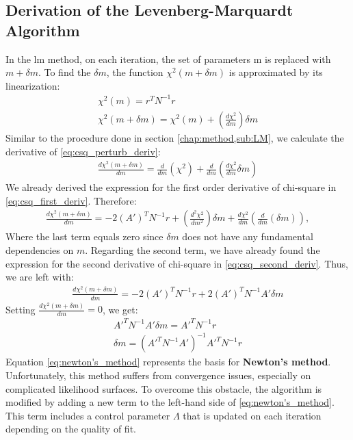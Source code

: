 \documentclass[12pt, TexShade, letterpaper]{report}
\begin{document}
\subsection{Derivation of the Levenberg-Marquardt Algorithm}
In the \gls{lm} method, on each iteration, the set of parameters m is replaced with $m+\delta m$. To find the $\delta m$, the function $\chi^2 (m +\delta m)$ is approximated by its linearization: 
\begin{gather}
    \chi^2 \left(m\right) = r^T N^{-1} r\\
    \chi^2 \left(m + \delta m\right) =  \chi^2 \left(m\right) + \left(\frac{d \chi^2}{dm}\right) \delta m \label{eq:csq_perturb_deriv}
\end{gather}
Similar to the procedure done in section \ref{chap:method,sub:LM}, we calculate the derivative of \ref{eq:csq_perturb_deriv}:
\begin{gather}
    \frac{d \chi^2 \left(m +\delta m\right)}{dm} = \frac{d}{dm} \left(\chi^2\right) + \frac{d}{dm} \left(\frac{d\chi^2}{dm} \delta m\right)
\end{gather}
We already derived the expression for the first order derivative of chi-square in \ref{eq:csq_first_deriv}. Therefore:
\begin{gather}
   \frac{d \chi^2 \left(m +\delta m\right)}{dm} =  -2 \left(A'\right)^T N^{-1} r + \left(\frac{d^2 \chi^2}{dm^2}\right) \delta m + \frac{d\chi^2}{dm} \left(\frac{d}{dm} (\delta m)\right),
\end{gather}
Where the last term equals zero since $\delta m$ does not have any fundamental dependencies on $m$. Regarding the second term, we have already found the expression for the second derivative of chi-square in \ref{eq:csq_second_deriv}. Thus, we are left with:
\begin{gather}
    \frac{d \chi^2 (m +\delta m)}{dm} =  -2 \left(A'\right)^T N^{-1} r + 2 \left(A'\right)^T N^{-1} A'\delta m
\end{gather}
Setting $\frac{d \chi^2 (m +\delta m)}{dm} = 0$, we get:
\begin{gather}
    A'^{T} N^{-1}A' \delta m = A'^T N^{-1} r \\
    \delta m = \left(A'^{T} N^{-1}A'\right)^{-1} A'^T N^{-1} r \label{eq:newton's_method}   
\end{gather}
Equation \ref{eq:newton's_method} represents the basis for \textbf{Newton's method}. Unfortunately, this method suffers from convergence issues, especially on complicated likelihood surfaces. To overcome this obstacle, the algorithm is modified by adding a new term to the left-hand side of \ref{eq:newton's_method}. This term includes a control parameter $\Lambda$ that is updated on each iteration depending on the quality of fit. 
\end{document}
